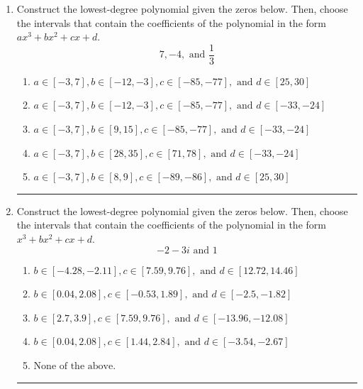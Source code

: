 \documentclass[14pt]{extbook}
\newcommand{\litem}[1]{\item#1\hspace*{-1cm}\rule{\textwidth}{0.4pt}}
\begin{document}
\begin{enumerate}
{\begin{enumerate}[label=\Alph*.]
\end{enumerate} }
\litem{
Construct the lowest-degree polynomial given the zeros below. Then, choose the intervals that contain the coefficients of the polynomial in the form $ax^3+bx^2+cx+d$.\[ 7, -4, \text{ and } \frac{1}{3} \]\begin{enumerate}[label=\Alph*.]
\item \( a \in [-3, 7], b \in [-12, -3], c \in [-85, -77], \text{ and } d \in [25, 30] \)
\item \( a \in [-3, 7], b \in [-12, -3], c \in [-85, -77], \text{ and } d \in [-33, -24] \)
\item \( a \in [-3, 7], b \in [9, 15], c \in [-85, -77], \text{ and } d \in [-33, -24] \)
\item \( a \in [-3, 7], b \in [28, 35], c \in [71, 78], \text{ and } d \in [-33, -24] \)
\item \( a \in [-3, 7], b \in [8, 9], c \in [-89, -86], \text{ and } d \in [25, 30] \)

\end{enumerate} }
\litem{
Construct the lowest-degree polynomial given the zeros below. Then, choose the intervals that contain the coefficients of the polynomial in the form $x^3+bx^2+cx+d$.\[ -2 - 3 i \text{ and } 1 \]\begin{enumerate}[label=\Alph*.]
\item \( b \in [-4.28, -2.11], c \in [7.59, 9.76], \text{ and } d \in [12.72, 14.46] \)
\item \( b \in [0.04, 2.08], c \in [-0.53, 1.89], \text{ and } d \in [-2.5, -1.82] \)
\item \( b \in [2.7, 3.9], c \in [7.59, 9.76], \text{ and } d \in [-13.96, -12.08] \)
\item \( b \in [0.04, 2.08], c \in [1.44, 2.84], \text{ and } d \in [-3.54, -2.67] \)
\item \( \text{None of the above.} \)


\end{enumerate}}
\end{enumerate}
\end{document}
